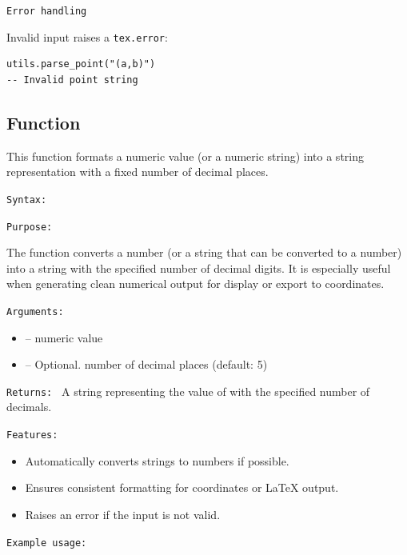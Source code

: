 \medskip
\texttt{Error handling}

Invalid input raises a \texttt{tex.error}:

\begin{verbatim}
utils.parse_point("(a,b)")
-- Invalid point string
\end{verbatim}



\subsection{Function }
\label{sub:function_utils_format_number}

This function formats a numeric value (or a numeric string) into a string representation with a fixed number of decimal places.

\texttt{Syntax: }

\begin{center}
\end{center}

\texttt{Purpose: }

The function converts a number (or a string that can be converted to a number) into a string with the specified number of decimal digits. It is especially useful when generating clean numerical output for display or export to \TIKZ{} coordinates.

\texttt{Arguments: }

\begin{itemize}
\item {} – numeric value
\item {} – Optional. number of decimal places (default: 5)
\end{itemize}

\texttt{Returns: } A string representing the value of  with the specified number of decimals.

\texttt{Features: }

\begin{itemize}
\item Automatically converts strings to numbers if possible.
\item Ensures consistent formatting for \TIKZ{} coordinates or LaTeX output.
\item Raises an error if the input is not valid.
\end{itemize}

\texttt{Example usage: }

